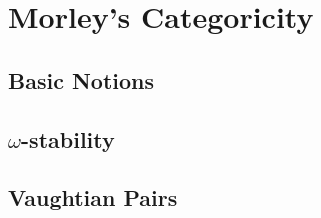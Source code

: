 \documentclass[10pt]{report}
\begin{document}






\chapter{Morley's Categoricity}

\section{Basic Notions}


\section{\(\omega\)-stability}


\section{Vaughtian Pairs}

%

%
\end{document}
